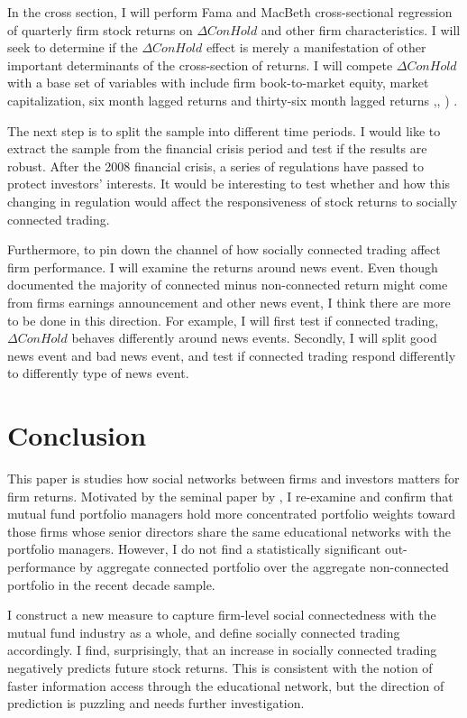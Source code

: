 \documentclass[11pt]{article}
\begin{document}
\begin{doublespace}
In the cross section, I will perform Fama and MacBeth \cite{fama1973risk} cross-sectional regression of quarterly firm stock returns on $\Delta ConHold$ and other firm characteristics. I will seek to determine if the $\Delta ConHold$ effect is merely a manifestation of other important determinants of the cross-section of returns. I will compete $\Delta ConHold$ with a base set of variables with include firm book-to-market equity, market capitalization, six month lagged returns and thirty-six month lagged returns \cite{fama1992cross},\cite{jegadeesh1993returns}, \cite{bondt1985does}) . 

The next step is to split the sample into different time periods. I would like to extract the sample from the financial crisis period and test if the results are robust. After the 2008 financial crisis, a series of regulations have passed to protect investors' interests. It would be interesting to test whether and how this changing in regulation would affect the responsiveness of stock returns to socially connected trading.


Furthermore, to pin down the channel of how socially connected trading affect firm performance. I will examine the returns around news event. Even though \cite{cohen2008small} documented the majority of connected minus non-connected return might come from firms earnings announcement and other news event, I think there are more to be done in this direction. For example, I will first test if connected trading, $\Delta ConHold$ behaves differently around news events. Secondly, I will split good news event and bad news event, and test if connected trading respond differently to differently type of news event. 


\section{Conclusion}
This paper is studies how social networks between firms and investors matters for firm returns. 
Motivated by the seminal paper by \cite{cohen2008small}, I re-examine and confirm that mutual fund portfolio managers hold more concentrated portfolio weights toward those firms whose senior directors share the same educational networks with the portfolio managers. However, I do not find a statistically significant out-performance by aggregate connected portfolio over the aggregate non-connected portfolio in the recent decade sample. 

I construct a new measure to capture firm-level social connectedness with the mutual fund industry as a whole, and define socially connected trading accordingly. I find, surprisingly, that an increase in socially connected trading negatively predicts future stock returns. This is consistent with the notion of faster information access through the educational network, but the direction of prediction is puzzling and needs further investigation. 


\end{doublespace}
\end{document}
